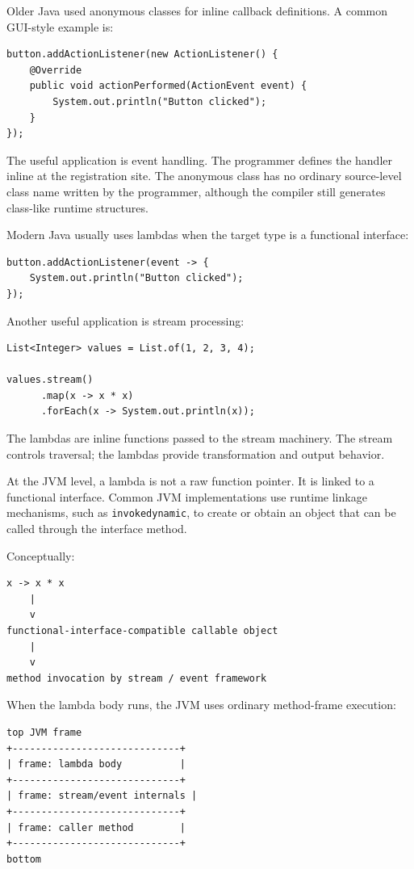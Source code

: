 Older Java used anonymous classes for inline callback definitions. A common GUI-style example is:

\begin{verbatim}
button.addActionListener(new ActionListener() {
    @Override
    public void actionPerformed(ActionEvent event) {
        System.out.println("Button clicked");
    }
});
\end{verbatim}

The useful application is event handling. The programmer defines the handler inline at the registration site. The anonymous class has no ordinary source-level class name written by the programmer, although the compiler still generates class-like runtime structures.

Modern Java usually uses lambdas when the target type is a functional interface:

\begin{verbatim}
button.addActionListener(event -> {
    System.out.println("Button clicked");
});
\end{verbatim}

Another useful application is stream processing:

\begin{verbatim}
List<Integer> values = List.of(1, 2, 3, 4);

values.stream()
      .map(x -> x * x)
      .forEach(x -> System.out.println(x));
\end{verbatim}

The lambdas are inline functions passed to the stream machinery. The stream controls traversal; the lambdas provide transformation and output behavior.

At the JVM level, a lambda is not a raw function pointer. It is linked to a functional interface. Common JVM implementations use runtime linkage mechanisms, such as \texttt{invokedynamic}, to create or obtain an object that can be called through the interface method.

Conceptually:

\begin{verbatim}
x -> x * x
    |
    v
functional-interface-compatible callable object
    |
    v
method invocation by stream / event framework
\end{verbatim}

When the lambda body runs, the JVM uses ordinary method-frame execution:

\begin{verbatim}
top JVM frame
+-----------------------------+
| frame: lambda body          |
+-----------------------------+
| frame: stream/event internals |
+-----------------------------+
| frame: caller method        |
+-----------------------------+
bottom
\end{verbatim}

